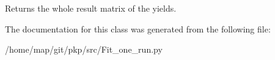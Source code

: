 \begin{DoxyVerb}Returns the whole result matrix of the yields.\end{DoxyVerb}
 

\-The documentation for this class was generated from the following file\-:\begin{DoxyCompactItemize}
\item 
/home/map/git/pkp/src/\-Fit\-\_\-one\-\_\-run.\-py\end{DoxyCompactItemize}

